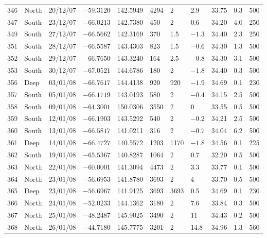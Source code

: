 \begin{sidewaystable}
\begin{tabularx}{\textheight}{lllllXXXXXX}
346 & North & 20/12/07 & $-59.3120$ & 142.5949 & 4294 & 2 & 2.9 & 33.75 & 0.3 & 500\\
347 & South & 23/12/07 & $-66.0213$ & 142.7380 & 450 & 2 & 0.6 & 34.20 & 4.0 & 250\\
349 & South & 27/12/07 & $-66.5662$ & 142.3169 & 370 & 1.5 & $-1.3$ & 34.40 & 2.3 & 250\\
351 & South & 28/12/07 & $-66.5587$ & 143.4303 & 823 & 1.5 & $-0.6$ & 34.30 & 1.3 & 500\\
352 & South & 29/12/07 & $-66.7650$ & 143.3240 & 164 & 2.5 & $-0.8$ & 34.30 & 3.1 & 500\\
353 & South & 30/12/07 & $-67.0521$ & 144.6786 & 180 & 2 & $-1.8$ & 34.40 & 0.3 & 500\\
356 & Deep  & 03/01/08 & $-66.7617$ & 144.4138 & 920 & 920 & $-1.9$ & 34.69 & 0.1 & 230\\
357 & South & 05/01/08 & $-66.1719$ & 143.0193 & 580 & 2 & $-0.4$ & 34.15 & 2.5 & 500\\
358 & South & 09/01/08 & $-64.3001$ & 150.0306 & 3550 & 2 & 0 & 33.55 & 0.5 & 500\\
359 & South & 12/01/08 & $-66.1903$ & 143.5292 & 540 & 2 & $-0.2$ & 34.21 & 2.5 & 500\\
360 & South & 13/01/08 & $-66.5817$ & 141.0211 & 316 & 2 & $-0.7$ & 34.04 & 6.2 & 500\\
361 & Deep  & 14/01/08 & $-66.4727$ & 140.5572 & 1203 & 1170 & $-1.8$ & 34.56 & 0.1 & 225\\
362 & South & 19/01/08 & $-65.5367$ & 140.8287 & 1064 & 2 & 0.7 & 32.20 & 0.5 & 500\\
363 & North & 22/01/08 & $-60.0001$ & 141.3094 & 4473 & 2 & 3.3 & 33.77 & 0.1 & 500\\
364 & North & 23/01/08 & $-56.6953$ & 141.8780 & 3693 & 2 & 4 & 33.70 & 0.5 & 500\\
365 & Deep  & 23/01/08 & $-56.6967$ & 141.9125 & 3693 & 3693 & 0.5 & 34.69 & 0.1 & 230\\
366 & North & 24/01/08 & $-52.0233$ & 144.1362 & 3180 & 2 & 7.6 & 33.84 & 0.3 & 500\\
367 & North & 25/01/08 & $-48.2487$ & 145.9025 & 3490 & 2 & 11 & 34.43 & 0.2 & 500\\
368 & North & 26/01/08 & $-44.7180$ & 145.7775 & 3201 & 2 & 14.8 & 34.96 & 1.3 & 560\\

\bottomrule
\end{tabularx}
\end{sidewaystable}
